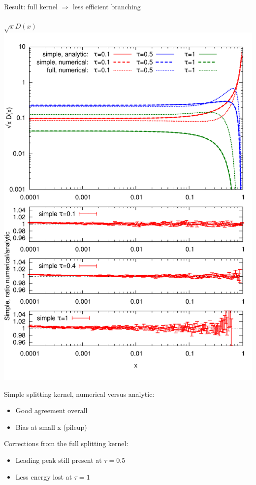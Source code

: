 \documentclass[pstricks,mathserif]{beamer}
\begin{document}
\begin{frame}

Result: full kernel $\Rightarrow$ less efficient branching\\
~\\



\centering
\small $\sqrt{x} D(x)$
\includegraphics[width=1\linewidth]{times.pdf}
\endminipage\hfill
{}
\small 

Simple splitting kernel, numerical versus analytic:
\begin{itemize}
\item Good agreement overall
\item Bias at small x (pileup)
\end{itemize}

Corrections from the full splitting kernel:
\begin{itemize}
\item Leading peak still present at $\tau=0.5$
\item Less energy lost at $\tau=1$
\end{itemize}
\endminipage\hfill


\end{frame}
\end{document}
